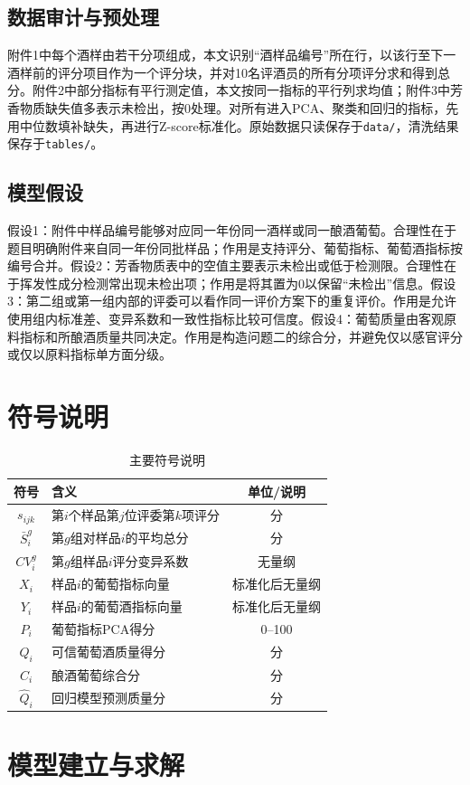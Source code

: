 \documentclass[UTF8,a4paper,12pt]{ctexart}
\begin{document}
\subsection{数据审计与预处理}
附件1中每个酒样由若干分项组成，本文识别“酒样品编号”所在行，以该行至下一酒样前的评分项目作为一个评分块，并对10名评酒员的所有分项评分求和得到总分。附件2中部分指标有平行测定值，本文按同一指标的平行列求均值；附件3中芳香物质缺失值多表示未检出，按0处理。对所有进入PCA、聚类和回归的指标，先用中位数填补缺失，再进行Z-score标准化。原始数据只读保存于\texttt{data/}，清洗结果保存于\texttt{tables/}。
\subsection{模型假设}
假设1：附件中样品编号能够对应同一年份同一酒样或同一酿酒葡萄。合理性在于题目明确附件来自同一年份同批样品；作用是支持评分、葡萄指标、葡萄酒指标按编号合并。假设2：芳香物质表中的空值主要表示未检出或低于检测限。合理性在于挥发性成分检测常出现未检出项；作用是将其置为0以保留“未检出”信息。假设3：第二组或第一组内部的评委可以看作同一评价方案下的重复评价。作用是允许使用组内标准差、变异系数和一致性指标比较可信度。假设4：葡萄质量由客观原料指标和所酿酒质量共同决定。作用是构造问题二的综合分，并避免仅以感官评分或仅以原料指标单方面分级。
\section{符号说明}
\begin{table}[H]\centering\caption{主要符号说明}\begin{tabular}{clc}\toprule 符号 & 含义 & 单位/说明\\\midrule
$s_{ijk}$ & 第$i$个样品第$j$位评委第$k$项评分 & 分\\
$\bar S_i^g$ & 第$g$组对样品$i$的平均总分 & 分\\
$CV_i^g$ & 第$g$组样品$i$评分变异系数 & 无量纲\\
$X_i$ & 样品$i$的葡萄指标向量 & 标准化后无量纲\\
$Y_i$ & 样品$i$的葡萄酒指标向量 & 标准化后无量纲\\
$P_i$ & 葡萄指标PCA得分 & 0--100\\
$Q_i$ & 可信葡萄酒质量得分 & 分\\
$C_i$ & 酿酒葡萄综合分 & 分\\
$\hat Q_i$ & 回归模型预测质量分 & 分\\\bottomrule\end{tabular}\end{table}
\section{模型建立与求解}
\end{document}
